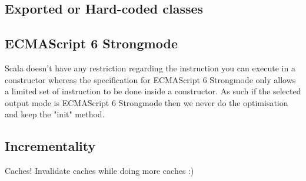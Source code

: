 \subsection{Exported or Hard-coded classes}
\subsection{ECMAScript 6 Strongmode}
Scala doesn't have any restriction regarding the instruction you can execute in a constructor whereas the specification for ECMAScript 6 Strongmode only allows a limited set of instruction to be done inside a constructor. As such if the selected output mode is ECMAScript 6 Strongmode then we never do the optimisation and keep the "init" method.
\subsection{Incrementality}
Caches! Invalidate caches while doing more caches :)

